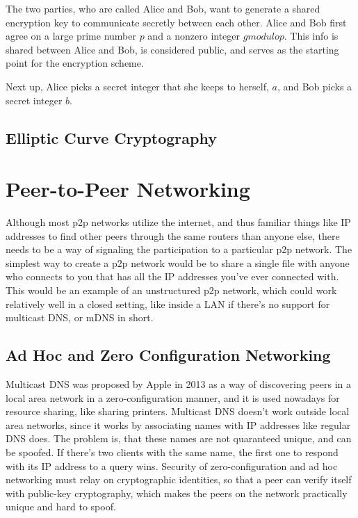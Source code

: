 The two parties, who are called Alice and Bob, want to generate a shared encryption key to communicate secretly between each other. Alice and Bob first agree on a large prime number \(p\) and a nonzero integer \(g  modulo  p\). This info is shared between Alice and Bob, is considered public, and serves as the starting point for the encryption scheme.
						
Next up, Alice picks a secret integer that she keeps to herself, \(a\), and Bob picks a secret integer \(b\). 
						

\section{Elliptic Curve Cryptography}
						
\chapter{Peer-to-Peer Networking}
\label{Peer-to-Peer Networking}
Although most p2p networks utilize the internet, and thus familiar things like IP addresses to find other peers through the same routers than anyone else, there needs to be a way of signaling the participation to a particular p2p network. The simplest way to create a p2p network would be to share a single file with anyone who connects to you that has all the IP addresses you've ever connected with. This would be an example of an unstructured p2p network, which could work relatively well in a closed setting, like inside a LAN if there's no support for multicast DNS, or mDNS in short.

\section{Ad Hoc and Zero Configuration Networking}
Multicast DNS was proposed by Apple in 2013\cite{Cheshire2013-ja} as a way of discovering peers in a local area network in a zero-configuration manner, and it is used nowadays for resource sharing, like sharing printers. Multicast DNS doesn't work outside local area networks, since it works by associating names with IP addresses like regular DNS does. The problem is, that these names are not quaranteed unique, and can be spoofed. If there's two clients with the same name, the first one to respond with its IP address to a query wins.\cite{Pdp2008-tg} Security of zero-configuration and ad hoc networking must relay on cryptographic identities, so that a peer can verify itself with public-key cryptography, which makes the peers on the network practically unique and hard to spoof.

